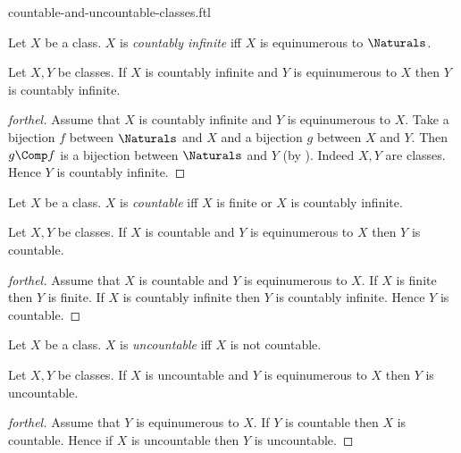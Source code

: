\documentclass{stex}
\begin{document}
\begin{smodule}{countable-and-uncountable-classes.ftl}



\begin{definition*}[forthel,for=countably infinite]
  Let $X$ be a class.
  $X$ is \emph{countably infinite} iff $X$ is equinumerous to $\Naturals$.
\end{definition*}

\begin{proposition*}[forthel]
  Let $X, Y$ be classes.
  If $X$ is countably infinite and $Y$ is equinumerous to $X$ then $Y$ is countably infinite.
\end{proposition*}
\begin{proof}[forthel]
  Assume that $X$ is countably infinite and $Y$ is equinumerous to $X$.
  Take a bijection $f$ between $\Naturals$ and $X$ and a bijection $g$ between $X$ and $Y$.
  Then $g \Comp f$ is a bijection between $\Naturals$ and $Y$ (by ).
  Indeed $X, Y$ are classes.
  Hence $Y$ is countably infinite.
\end{proof}

\begin{definition*}[forthel,for=countable]
  Let $X$ be a class.
  $X$ is \emph{countable} iff $X$ is finite or $X$ is countably infinite.
\end{definition*}

\begin{proposition*}[forthel]
  Let $X, Y$ be classes.
  If $X$ is countable and $Y$ is equinumerous to $X$ then $Y$ is countable.
\end{proposition*}
\begin{proof}[forthel]
  Assume that $X$ is countable and $Y$ is equinumerous to $X$.
  If $X$ is finite then $Y$ is finite.
  If $X$ is countably infinite then $Y$ is countably infinite.
  Hence $Y$ is countable.
\end{proof}

\begin{definition*}[forthel,for=uncountable]
  Let $X$ be a class.
  $X$ is \emph{uncountable} iff $X$ is not countable.
\end{definition*}

\begin{proposition*}[forthel]
  Let $X, Y$ be classes.
  If $X$ is uncountable and $Y$ is equinumerous to $X$ then $Y$ is uncountable.
\end{proposition*}
\begin{proof}[forthel]
  Assume that $Y$ is equinumerous to $X$.
  If $Y$ is countable then $X$ is countable.
  Hence if $X$ is uncountable then $Y$ is uncountable.
\end{proof}

\end{smodule}
\end{document}
